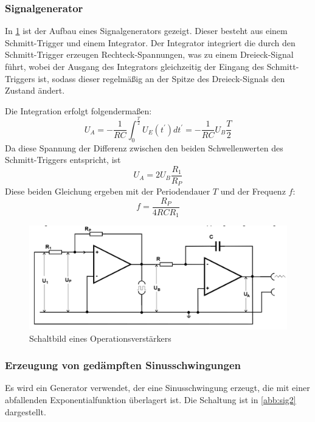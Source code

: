 \subsubsection{Signalgenerator}
In \ref{abb:sig} ist der Aufbau eines Signalgenerators gezeigt. Dieser besteht aus einem Schmitt-Trigger und einem Integrator. Der Integrator integriert die durch den Schmitt-Trigger erzeugen Rechteck-Spannungen, was zu einem Dreieck-Signal führt, wobei der Ausgang des Integrators gleichzeitig der Eingang des Schmitt-Triggers ist, sodass dieser regelmäßig an der Spitze des Dreieck-Signals den Zustand ändert.

Die Integration erfolgt folgendermaßen:
\begin{equation}
U_A = - \frac{1}{RC} \int_{0}^{\frac{T}{2}} U_E(t^\prime)dt^\prime = -\frac{1}{RC} U_B \frac{T}{2}
\end{equation}
Da diese Spannung der Differenz zwischen den beiden Schwellenwerten des Schmitt-Triggers entspricht, ist
\begin{equation}
U_A = 2U_B\frac{R_1}{R_P}
\end{equation}
Diese beiden Gleichung ergeben mit der Periodendauer $T$ und der Frequenz $f$:
\begin{equation}
f = \frac{R_P}{4RCR_1}
\end{equation}

\begin{figure}
 	\centering
 	\includegraphics[width=\textwidth]{img/gen.png}
 	\caption{Schaltbild eines Operationsverstärkers}
 	\label{abb:sig}
\end{figure}

\subsubsection{Erzeugung von ged{\"a}mpften Sinusschwingungen}
Es wird ein Generator verwendet, der eine Sinusschwingung erzeugt, die mit einer abfallenden Exponentialfunktion überlagert ist. Die Schaltung ist in \ref{abb:sig2} dargestellt.

